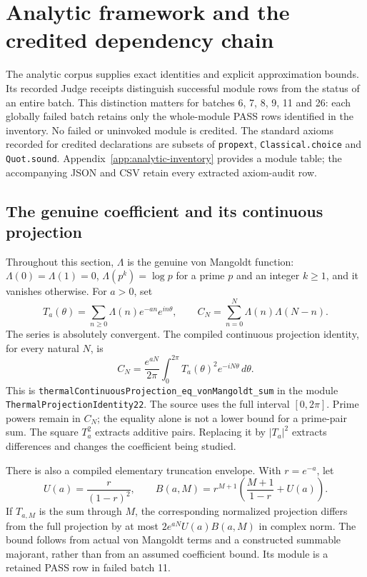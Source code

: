 \section{Analytic framework and the credited dependency chain}
\label{sec:analytic}

The analytic corpus supplies exact identities and explicit approximation
bounds. Its recorded Judge receipts distinguish successful module rows from
the status of an entire batch. This distinction matters for batches 6, 7, 8,
9, 11 and 26: each globally failed batch retains only the whole-module PASS
rows identified in the inventory. No failed or uninvoked module is credited.
The standard axioms recorded for credited declarations are subsets of
\texttt{propext}, \texttt{Classical.choice} and \texttt{Quot.sound}.
Appendix~\ref{app:analytic-inventory} provides a module table; the accompanying
JSON and CSV retain every extracted axiom-audit row.

\subsection{The genuine coefficient and its continuous projection}

Throughout this section, $\Lambda$ is the genuine von Mangoldt function:
$\Lambda(0)=\Lambda(1)=0$, $\Lambda(p^k)=\log p$ for a prime $p$ and
an integer $k\geq1$, and it vanishes otherwise. For $a>0$, set
\begin{equation}
 T_a(\theta)=\sum_{n\geq0}\Lambda(n)e^{-an}e^{in\theta},\qquad
 C_N=\sum_{n=0}^{N}\Lambda(n)\Lambda(N-n).
 \label{eq:analytic-definitions}
\end{equation}
The series is absolutely convergent. The compiled continuous projection
identity, for every natural $N$, is
\begin{equation}
 C_N=\frac{e^{aN}}{2\pi}\int_0^{2\pi}
          T_a(\theta)^2e^{-iN\theta}\,d\theta.
 \label{eq:circle-identity}
\end{equation}
This is \nolinkurl{thermalContinuousProjection_eq_vonMangoldt_sum}
in the module \nolinkurl{ThermalProjectionIdentity22}.
The source uses the full interval $[0,2\pi]$. Prime powers remain in $C_N$;
the equality alone is not a lower bound for a prime-pair sum. The square
$T_a^2$ extracts additive pairs. Replacing it by $|T_a|^2$ extracts
differences and changes the coefficient being studied.

There is also a compiled elementary truncation envelope. With $r=e^{-a}$,
let
\begin{equation}
 U(a)=\frac{r}{(1-r)^2},\qquad
 B(a,M)=r^{M+1}\left(\frac{M+1}{1-r}+U(a)\right).
\end{equation}
If $T_{a,M}$ is the sum through $M$, the corresponding normalized
projection differs from the full projection by at most
$2e^{aN}U(a)B(a,M)$ in complex norm. The bound follows from actual
von Mangoldt terms and a constructed summable majorant, rather than from
an assumed coefficient bound. Its module is a retained PASS row in failed
batch 11.

